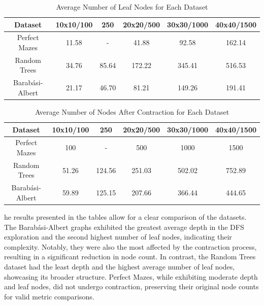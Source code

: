 \begin{table}[H]
    \centering
    \caption{Average Number of Leaf Nodes for Each Dataset}
    \label{tab:average_leaf_nodes}
    \begin{tabular}{|c|c|c|c|c|c|} 
        \hline
        \textbf{Dataset} & \textbf{10x10/100} & \textbf{250} & \textbf{20x20/500} & \textbf{30x30/1000} & \textbf{40x40/1500} \\ 
        \hline
        Perfect Mazes & 11.58 & - & 41.88 & 92.58 & 162.14 \\ 
        \hline
        Random Trees & 34.76 & 85.64 & 172.22 & 345.41 & 516.53 \\ 
        \hline
        Barabási-Albert & 21.17 & 46.70 & 81.21 & 149.26 & 191.41 \\ 
        \hline
    \end{tabular}
\end{table}

\begin{table}[H]
    \centering
    \caption{Average Number of Nodes After Contraction for Each Dataset}
    \label{tab:nodes_after_contraction}
    \begin{tabular}{|c|c|c|c|c|c|} 
        \hline
        \textbf{Dataset} & \textbf{10x10/100} & \textbf{250} & \textbf{20x20/500} & \textbf{30x30/1000} & \textbf{40x40/1500} \\ 
        \hline
        Perfect Mazes & 100 & - & 500 & 1000 & 1500 \\ 
        \hline
        Random Trees & 51.26 & 124.56 & 251.03 & 502.02 & 752.89 \\ 
        \hline
        Barabási-Albert & 59.89 & 125.15 & 207.66 & 366.44 & 444.65 \\ 
        \hline
    \end{tabular}
\end{table}

he results presented in the tables allow for a clear comparison of the datasets. The Barabási-Albert graphs exhibited the greatest average depth in the DFS exploration and the second highest number of leaf nodes, indicating their complexity. Notably, they were also the most affected by the contraction process, resulting in a significant reduction in node count. In contrast, the Random Trees dataset had the least depth and the highest average number of leaf nodes, showcasing its broader structure. Perfect Mazes, while exhibiting moderate depth and leaf nodes, did not undergo contraction, preserving their original node counts for valid metric comparisons.

